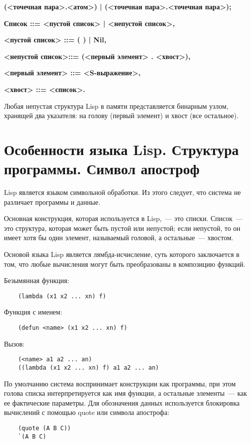 \textbf{(<точечная пара>.<атом>) | (<точечная пара>.<точечная пара>);}

\textbf{Список ::= <пустой список> | <непустой список>,}

\textbf{<пустой список> ::= ( ) | Nil,}

\textbf{<непустой список>::= (<первый элемент> . <хвост>),}

\textbf{<первый элемент> ::= <S-выражение>,}

\textbf{<хвост> ::= <список>.}

Любая непустая структура Lisp в памяти представляется бинарным узлом, хранящей два указателя: на голову (первый элемент) и хвост (все остальное).

\section{Особенности языка Lisp. Структура программы. Символ апостроф}

Lisp является языком символьной обработки.
Из этого следует, что система не различает программы и данные.

Основная конструкция, которая используется в Lisp,~--- это списки. Список~--- это структура, которая может быть пустой или непустой; если непустой, то он имеет хотя бы один элемент, называемый головой, а остальные~--- хвостом.

Основой языка Lisp является лямбда-исчисление, суть которого заключается в том, что любые вычисления могут быть преобразованы в композицию функций.

Безымянная функция:
\begin{lstlisting}
	(lambda (x1 x2 ... xn) f)
\end{lstlisting}

Функция с именем:
\begin{lstlisting}
	(defun <name> (x1 x2 ... xn) f)
\end{lstlisting}

Вызов:
\begin{lstlisting}
	(<name> a1 a2 ... an)
	((lambda (x1 x2 ... xn) f) a1 a2 ... an)
\end{lstlisting}

По умолчанию система воспринимает конструкции как программы, при этом голова списка интерпретируется как имя функции, а остальные элементы~--- как ее фактические параметры. Для обозначения данных используется блокировка вычислений с помощью quote или символа апострофа:
\begin{lstlisting}
	(quote (A B C))
	`(A B C)
\end{lstlisting}

